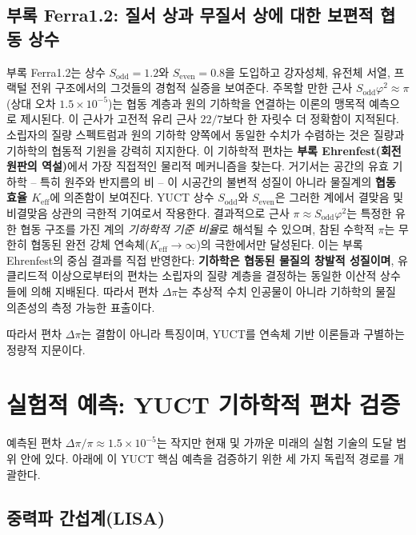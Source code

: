 \documentclass[11pt,a4paper]{article}
\begin{document}
	\subsection{부록 Ferra1.2: 질서 상과 무질서 상에 대한 보편적 협동 상수}
	
	부록 Ferra1.2는 상수 \(S_{\mathrm{odd}}=1.2\)와 \(S_{\mathrm{even}}=0.8\)을 도입하고 강자성체, 유전체 서열, 프랙털 전위 구조에서의 그것들의 경험적 실증을 보여준다. 주목할 만한 근사 \(S_{\mathrm{odd}}\varphi^2 \approx \pi\)(상대 오차 \(1.5\times10^{-5}\))는 협동 계층과 원의 기하학을 연결하는 이론의 맹목적 예측으로 제시된다. 이 근사가 고전적 유리 근사 \(22/7\)보다 한 자릿수 더 정확함이 지적된다. 소립자의 질량 스펙트럼과 원의 기하학 양쪽에서 동일한 수치가 수렴하는 것은 질량과 기하학의 협동적 기원을 강력히 지지한다. 이 기하학적 편차는 \textbf{부록 Ehrenfest(회전 원판의 역설)}에서 가장 직접적인 물리적 메커니즘을 찾는다. 거기서는 공간의 유효 기하학 – 특히 원주와 반지름의 비 – 이 시공간의 불변적 성질이 아니라 물질계의 \textbf{협동 효율 \(K_{\mathrm{eff}}\)}에 의존함이 보여진다. YUCT 상수 \(S_{\mathrm{odd}}\)와 \(S_{\mathrm{even}}\)은 그러한 계에서 결맞음 및 비결맞음 상관의 극한적 기여로서 작용한다. 결과적으로 근사 \(\pi \approx S_{\mathrm{odd}}\varphi^2\)는 특정한 유한 협동 구조를 가진 계의 \textit{기하학적 기준 비율}로 해석될 수 있으며, 참된 수학적 \(\pi\)는 무한히 협동된 완전 강체 연속체(\(K_{\mathrm{eff}} \to \infty\))의 극한에서만 달성된다. 이는 부록 Ehrenfest의 중심 결과를 직접 반영한다: \textbf{기하학은 협동된 물질의 창발적 성질이며}, 유클리드적 이상으로부터의 편차는 소립자의 질량 계층을 결정하는 동일한 이산적 상수들에 의해 지배된다. 따라서 편차 \(\Delta\pi\)는 추상적 수치 인공물이 아니라 기하학의 물질 의존성의 측정 가능한 표출이다.
	
	따라서 편차 \(\Delta\pi\)는 결함이 아니라 특징이며, YUCT를 연속체 기반 이론들과 구별하는 정량적 지문이다.
	
	\section{실험적 예측: YUCT 기하학적 편차 검증}
	
	예측된 편차 \(\Delta\pi/\pi \approx 1.5\times10^{-5}\)는 작지만 현재 및 가까운 미래의 실험 기술의 도달 범위 안에 있다. 아래에 이 YUCT 핵심 예측을 검증하기 위한 세 가지 독립적 경로를 개괄한다.
	
	\subsection{중력파 간섭계(LISA)}
	
\end{document}
